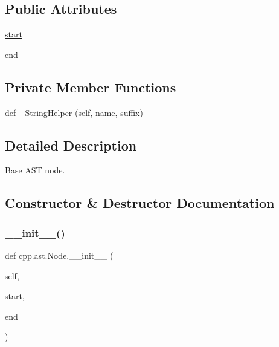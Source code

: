 \subsection*{Public Attributes}
\begin{DoxyCompactItemize}
\item 
\mbox{\hyperlink{classcpp_1_1ast_1_1_node_a7b2aa97e6a049bb1a93aea48c48f1f44}{start}}
\item 
\mbox{\hyperlink{classcpp_1_1ast_1_1_node_a3c5e5246ccf619df28eca02e29d69647}{end}}
\end{DoxyCompactItemize}
\subsection*{Private Member Functions}
\begin{DoxyCompactItemize}
\item 
def \mbox{\hyperlink{classcpp_1_1ast_1_1_node_acb9507fa368fa5d6045a9eb9a0a8c3d3}{\+\_\+\+String\+Helper}} (self, name, suffix)
\end{DoxyCompactItemize}


\subsection{Detailed Description}
\begin{DoxyVerb}Base AST node.\end{DoxyVerb}
 

\subsection{Constructor \& Destructor Documentation}
\mbox{\label{classcpp_1_1ast_1_1_node_a2cbd6969346645259afc3be51faae904}} 
\subsubsection{\texorpdfstring{\_\_init\_\_()}{\_\_init\_\_()}}
{\footnotesize\ttfamily def cpp.\+ast.\+Node.\+\_\+\+\_\+init\+\_\+\+\_\+ (\begin{DoxyParamCaption}\item[{}]{self,  }\item[{}]{start,  }\item[{}]{end }\end{DoxyParamCaption})}



